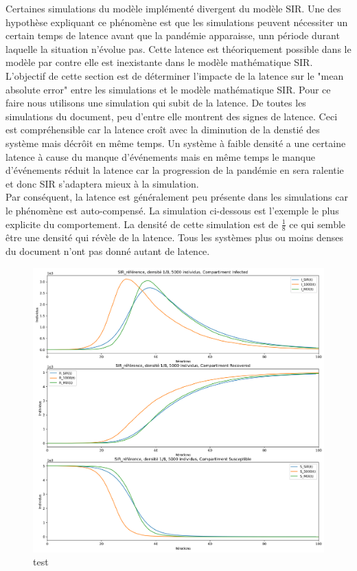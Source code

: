 Certaines simulations du modèle implémenté divergent du modèle SIR. Une des hypothèse expliquant ce phénomène est que les simulations peuvent nécessiter un certain temps de latence avant que la pandémie apparaisse, unn période durant laquelle la situation n'évolue pas. Cette latence est théoriquement possible dans le modèle par contre elle est inexistante dans le modèle mathématique SIR.\\

L'objectif de cette section est de déterminer l'impacte de la latence sur le "mean absolute error" entre les simulations et le modèle mathématique SIR. Pour ce faire nous utilisons une simulation qui subit de la latence. De toutes les simulations du document, peu d'entre elle montrent des signes de latence. Ceci est compréhensible car la latence croît avec la diminution de la denstié des système mais décrôit en même temps. Un système à faible densité a une certaine latence à cause du manque d'événements mais en même temps le manque d'événements réduit la latence car la progression de la pandémie en sera ralentie et donc SIR s'adaptera mieux à la simulation.\\

Par conséquent, la latence est généralement peu présente dans les simulations car le phénomène est auto-compensé. La simulation ci-dessous est l'exemple le plus explicite du comportement. La densité de cette simulation est de $\frac{1}{8}$ ce qui semble être une densité qui révèle de la latence. Tous les systèmes plus ou moins denses du document n'ont pas donné autant de latence.

\newpage

\begin{figure}[h]
	\centering
	\captionsetup{justification=centering}
	\includegraphics[width=.6\textwidth]{Images/SIR_ref_8_5.png}
	\caption{test}
\end{figure}

